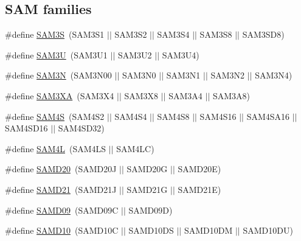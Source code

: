 \subsection*{S\+A\+M families}
\begin{DoxyCompactItemize}
\item 
\#define \hyperlink{group__sam__part__macros__group_gaaa8d9ee5981c67997fbdf923247bcb68}{S\+A\+M3\+S}~(S\+A\+M3\+S1 $\vert$$\vert$ S\+A\+M3\+S2 $\vert$$\vert$ S\+A\+M3\+S4 $\vert$$\vert$ S\+A\+M3\+S8 $\vert$$\vert$ S\+A\+M3\+S\+D8)
\item 
\#define \hyperlink{group__sam__part__macros__group_ga987abac1ef39b0b447b8b11419942476}{S\+A\+M3\+U}~(S\+A\+M3\+U1 $\vert$$\vert$ S\+A\+M3\+U2 $\vert$$\vert$ S\+A\+M3\+U4)
\item 
\#define \hyperlink{group__sam__part__macros__group_ga52239420b96aa3f1a273665cfd3b60a1}{S\+A\+M3\+N}~(S\+A\+M3\+N00 $\vert$$\vert$ S\+A\+M3\+N0 $\vert$$\vert$ S\+A\+M3\+N1 $\vert$$\vert$ S\+A\+M3\+N2 $\vert$$\vert$ S\+A\+M3\+N4)
\item 
\#define \hyperlink{group__sam__part__macros__group_gaae4990dfaa4eeed17d8a0351cca02fdd}{S\+A\+M3\+X\+A}~(S\+A\+M3\+X4 $\vert$$\vert$ S\+A\+M3\+X8 $\vert$$\vert$ S\+A\+M3\+A4 $\vert$$\vert$ S\+A\+M3\+A8)
\item 
\#define \hyperlink{group__sam__part__macros__group_gac3e6ef71bec5113415a64bb14ce8be24}{S\+A\+M4\+S}~(S\+A\+M4\+S2 $\vert$$\vert$ S\+A\+M4\+S4 $\vert$$\vert$ S\+A\+M4\+S8 $\vert$$\vert$ S\+A\+M4\+S16 $\vert$$\vert$ S\+A\+M4\+S\+A16 $\vert$$\vert$ S\+A\+M4\+S\+D16 $\vert$$\vert$ S\+A\+M4\+S\+D32)
\item 
\#define \hyperlink{group__sam__part__macros__group_gabf4b4fa802cbb57480225dd3c8f7a41b}{S\+A\+M4\+L}~(S\+A\+M4\+L\+S $\vert$$\vert$ S\+A\+M4\+L\+C)
\item 
\#define \hyperlink{group__sam__part__macros__group_gad9193543e761f5967353a0464dde1e61}{S\+A\+M\+D20}~(S\+A\+M\+D20\+J $\vert$$\vert$ S\+A\+M\+D20\+G $\vert$$\vert$ S\+A\+M\+D20\+E)
\item 
\#define \hyperlink{group__sam__part__macros__group_gab9217b15071242235d3014381d61dbf7}{S\+A\+M\+D21}~(S\+A\+M\+D21\+J $\vert$$\vert$ S\+A\+M\+D21\+G $\vert$$\vert$ S\+A\+M\+D21\+E)
\item 
\#define \hyperlink{group__sam__part__macros__group_gafca3f645579e1a67ce865408ecb5269f}{S\+A\+M\+D09}~(S\+A\+M\+D09\+C $\vert$$\vert$ S\+A\+M\+D09\+D)
\item 
\#define \hyperlink{group__sam__part__macros__group_gac83f6794433f2c57bfc5c520fe3d67ce}{S\+A\+M\+D10}~(S\+A\+M\+D10\+C $\vert$$\vert$ S\+A\+M\+D10\+D\+S $\vert$$\vert$ S\+A\+M\+D10\+D\+M $\vert$$\vert$ S\+A\+M\+D10\+D\+U)

\end{DoxyCompactItemize}
